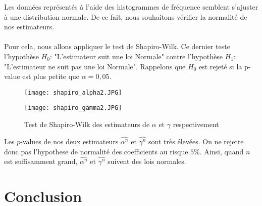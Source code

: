 \documentclass[12pt,a4paper]{report}
\theoremstyle{remark}
\begin{document}
Les données représentés à l'aide des histogrammes de fréquence semblent s'ajuster à une distribution normale. De ce fait, nous souhaitons vérifier la normalité de nos estimateurs. \\
\\
Pour cela, nous allons appliquer le  test de Shapiro-Wilk. Ce dernier  teste l'hypothèse $H_0$: "L'estimateur suit une loi Normale" contre l'hypothèse $H_1$: "L'estimateur ne suit pas une loi Normale". Rappelons que $H_0$ est rejeté si la p-value est plus petite que $\alpha=0,05$. 
\newpage
\begin{figure}[h!]
 \begin{minipage}[c]{0.25\linewidth}
        \centering
        \texttt{[image: shapiro\_alpha2.JPG]}
    \end{minipage}
    \hfill%
    \vspace{0.1cm}
    \begin{minipage}[c]{0.50\linewidth}
        \centering
       \texttt{[image: shapiro\_gamma2.JPG]}
    \end{minipage}
    \caption{Test de Shapiro-Wilk des estimateurs de $\alpha$ et $\gamma$ respectivement}

\end{figure}

Les $p$-values de nos deux estimateurs $\hat{\alpha^n}$ et $\hat{\gamma^n}$ sont très élevées. On ne rejette donc pas l'hypothese de normalité des coefficients au risque $5 \%$. Ainsi, quand $n$ est suffisamment grand, $\hat{\alpha^n}$ et $\hat{\gamma^n}$ suivent des lois normales.


\newpage
\section*{Conclusion}
\vspace{0.6cm}
\end{document}
